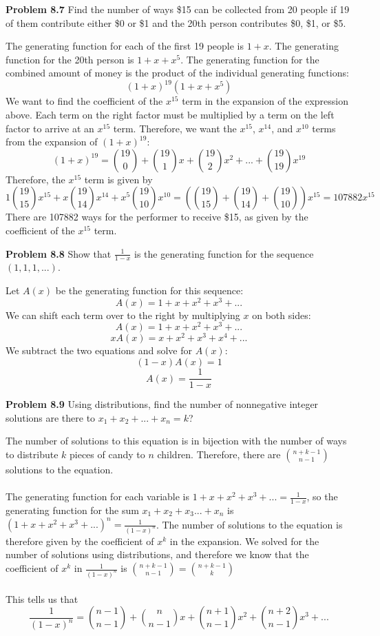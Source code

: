 \documentclass[11pt]{scrartcl}
\begin{document}
\begin{tcolorbox}
\textbf{Problem 8.7} Find the number of ways \$15 can be collected from 20 people if 19 of them contribute either \$0 or \$1 and the 20th person contributes \$0, \$1, or \$5.
\end{tcolorbox}
\noindent 
The generating function for each of the first 19 people is $1+x$. The generating function for the 20th person is $1+x+x^5$. The generating function for the combined amount of money is the product of the individual generating functions: 
$$(1+x)^{19}(1+x+x^5)$$
We want to find the coefficient of the $x^{15}$ term in the expansion of the expression above. Each term on the right factor must be multiplied by a term on the left factor to arrive at an $x^{15}$ term. Therefore, we want the $x^{15}$, $x^{14}$, and $x^{10}$ terms from the expansion of $(1+x)^{19}$:
$$(1+x)^{19}={19 \choose 0}+{19 \choose 1}x+{19 \choose 2}x^2+...+{19 \choose 19}x^{19}$$
Therefore, the $x^{15}$ term is given by
$${1}{19 \choose 15}x^{15}+x{19 \choose 14}x^{14}+x^5{19 \choose 10}x^{10}=\left({19 \choose 15}+{19 \choose 14}+{19 \choose 10}\right)x^{15}=107882x^{15}$$
There are 107882 ways for the performer to receive \$15, as given by the coefficient of the $x^{15}$ term.
\\
\begin{tcolorbox}
\textbf{Problem 8.8} Show that $\frac{1}{1-x}$ is the generating function for the sequence $(1,1,1,...)$.
\end{tcolorbox}
\noindent 
Let $A(x)$ be the generating function for this sequence: 
$$A(x)=1+x+x^2+x^3+...$$
We can shift each term over to the right by multiplying $x$ on both sides: 
$$A(x)=1+x+x^2+x^3+...$$
$$xA(x)=x+x^2+x^3+x^4+...$$
We subtract the two equations and solve for $A(x)$: 
$$(1-x)A(x)=1$$
$$A(x)=\frac{1}{1-x}$$
\begin{tcolorbox}
\textbf{Problem 8.9} Using distributions, find the number of nonnegative integer solutions are there to $x_1+x_2+...+x_n=k$? 
\end{tcolorbox}
\noindent 
The number of solutions to this equation is in bijection with the number of ways to distribute $k$ pieces of candy to $n$ children. Therefore, there are ${{n+k-1} \choose {n-1}}$ solutions to the equation. \\
\\
\noindent 
The generating function for each variable is $1+x+x^2+x^3+...=\frac{1}{1-x}$, so the generating function for the sum $x_1+x_2+x_3...+x_n$ is $(1+x+x^2+x^3+...)^n=\frac{1}{(1-x)^n}$. The number of solutions to the equation is therefore given by the coefficient of $x^k$ in the expansion. We solved for the number of solutions using distributions, and therefore we know that the coefficient of $x^k$ in $\frac{1}{(1-x)^n}$ is ${{n+k-1} \choose {n-1}}={{n+k-1} \choose {k}}$\\
\\
\noindent 
This tells us that 
$$\frac{1}{(1-x)^n}={{n-1} \choose {n-1}}+{{n} \choose {n-1}}x+{{n+1} \choose {n-1}}x^2+{{n+2} \choose {n-1}}x^3+...$$
\end{document}
